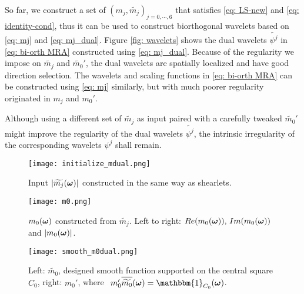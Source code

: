 So far, we construct a set of $(m_j,\widetilde{m_j})_{j = 0,\cdots,6}$ that satisfies \eqref{eq: LS-new} and \eqref{eq: identity-cond}, thus it can be used to construct biorthogonal wavelets based on \eqref{eq: mj} and \eqref{eq: mj_dual}. Figure \ref{fig: wavelets} shows the dual wavelets  $\widetilde{\psi^j}$ in \eqref{eq: bi-orth MRA} constructed using \eqref{eq: mj_dual}. Because of the regularity we impose on $\widetilde{m_j}$ and $\widetilde{m_0}'$, the dual wavelets are spatially localized and have good direction selection. The wavelets and scaling functions in \eqref{eq: bi-orth MRA} can be constructed using \eqref{eq: mj} similarly, but with much poorer regularity originated in $m_j$ and $m_0'$.

Although using a different set of $\widetilde{m_j}$ as input paired with a carefully tweaked $\widetilde{m_0}'$ might improve the regularity of the dual wavelets $\widetilde{\psi^j}$, the intrinsic irregularity of the corresponding wavelets $\psi^j$ shall remain.

\begin{figure}
\centering
\texttt{[image: initialize\_mdual.png]}
\caption{ Input $|\widetilde{m_{j}}(\boldsymbol{\omega})|$ constructed in the same way as shearlets.}
\label{fig: mjdual}
\end{figure}

\begin{figure}
\centering
\texttt{[image: m0.png]}
\caption{ $m_0(\boldsymbol{\omega})$ constructed from $\widetilde{m_j}$. Left to right: $Re(m_0(\boldsymbol{\omega})),\, Im(m_0(\boldsymbol{\omega}))$ and $|m_0(\boldsymbol{\omega})|$.}
\label{fig: m_0}
\end{figure}

\begin{figure}
\centering
\texttt{[image: smooth\_m0dual.png]}
\caption{ Left: $\widetilde{m_0}$, designed smooth function supported on the central square $C_0$, right: $m_0'$, where $\;\, m_0'\sbarm{0} = \mathbbm{1}_{C_0}(\V{\omega})$. } 
\label{fig: smooth_m0dual}
\end{figure}

\begin{comment}
\begin{figure}
\centering
\texttt{[image: m0\_m0dual\_new.png]}
\caption{$|\m{0}|$ and $m_0\sbarm{0}$, where $\m{0}$ is solved by optimization \eqref{eq: opt}, given $\widetilde{m_j}$ in Figure \ref{fig: mjdual} and $m_0$ in Figure \ref{fig: m_0}. Left to right: $|\m{0}|$, $Re(m_0\sbarm{0})$ and $Im(m_0\sbarm{0})$. }
\label{fig: m_0_m0dual}
\end{figure}
\end{comment}

